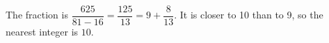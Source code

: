 The fraction is $\dfrac{625}{81-16}=\dfrac{125}{13}=9+\dfrac{8}{13}$. It is closer to 10 than to 9, so the nearest integer is $\boxed{10}$.
